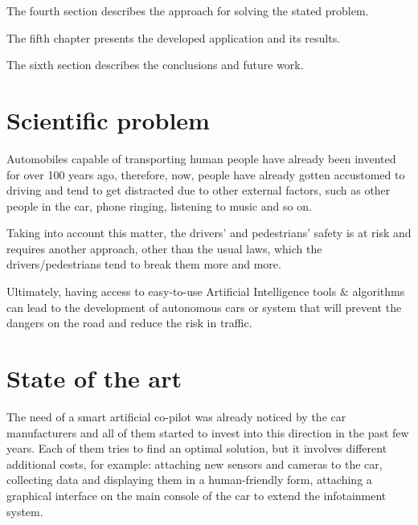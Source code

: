 \documentclass[12pt]{report}
\renewcommand{\_}{\kern-1.5pt\textunderscore\kern-1.5pt}
\begin{document}
\begin{justify}
The fourth section describes the approach for solving the stated problem.
\end{justify}\par

\begin{justify}
The fifth chapter presents the developed application and its results.
\end{justify}\par

\begin{justify}
The sixth section describes the conclusions and future work.
\end{justify}\par

\tab 
\vspace{\baselineskip}
\vspace{\baselineskip}
\chapter{Scientific problem}
\begin{justify}
Automobiles capable of transporting human people have already been invented for over 100 years ago, therefore, now, people have already gotten accustomed to driving and tend to get distracted due to other external factors, such as other people in the car, phone ringing, listening to music and so on. 
\end{justify}\par

\begin{justify}
Taking into account this matter, the drivers’ and pedestrians’ safety is at risk and requires another approach, other than the usual laws, which the drivers/pedestrians tend to break them more and more. 
\end{justify}\par

\begin{justify}
Ultimately, having access to easy-to-use Artificial Intelligence tools $\&$  algorithms can lead to the development of autonomous cars or system that will prevent the dangers on the road and reduce the risk in traffic.
\end{justify}\par

\chapter{State of the art}
The need of a smart artificial co-pilot was already noticed by the car manufacturers and all of them started to invest into this direction in the past few years. Each of them tries to find an optimal solution, but it involves different additional costs, for example: attaching new sensors and cameras to the car, collecting data and displaying them in a human-friendly form, attaching a graphical interface on the main console of the car to extend the infotainment system. \par
\end{document}
